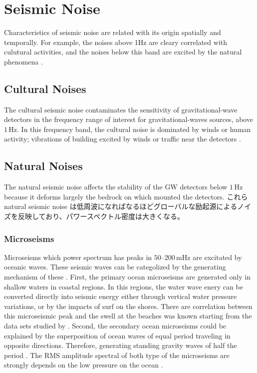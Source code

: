 \section{Seismic Noise}\label{sec:31}
Characteristics of seismic noise are related with its origin spatially and temporally. For example, the noises above 1Hz are cleary correlated with culutural activities, and the noises below this band are excited by the natural phenomena \cite{bonnefoy2006nature}. 
\subsection{Cultural Noises} \label{sec:311}
The cultural seismic noise contaminates the sensitivity of gravitational-wave detectors in the frequency range of interest for gravitational-waves sources, above $1\,\mathrm{Hz}$. In this frequency band, the cultural noise is dominated by winds or human activity; vibrations of building excited by winds\cite{schofield2000source} or traffic near the detectors \cite{acernese2004properties}. 

\subsection{Natural Noises} \label{sec:312}
The natural seismic noise affects the stability of the GW detectors below $1\,\mathrm{Hz}$ because it deforms largely the bedrock on which mounted the detectors. これらnatural seismic noise は低周波になればなるほどグローバルな励起源によるノイズを反映しており、パワースペクトル密度は大きくなる。

\subsubsection{Microseisms}
Microseisms which power spectrum has peaks in $50$--$200\,\mathrm{mHz}$ are excitated by oceanic waves. These seismic waves can be categolized by the generating mechanism of these \cite{Bormann2012new}. First, the primary ocean microseisms are generated only in shallow waters in coastal regions. In this regions, the water wave enery can be converted directly into seismic energy either through vertical water pressure variations, or by the impacts of surf on the shores. There are correlation between this microseismic peak and the swell at the beaches was known starting from the data sets studied by \cite{haubrich1963comparative}. Second, the secondary ocean microseisms could be explained by the superposition of ocean waves of equal period traveling in opposite directions. Therefore, generating standing gravity waves of half the period \cite{longuet1950theory}. The RMS amplitude spectral of both type of the microseisms are strongly depends on the low pressure on the ocean \cite{naticchioni2014microseismic}.

